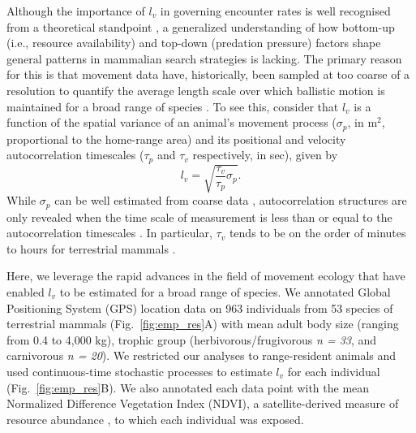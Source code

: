 \documentclass[12pt]{article}
\begin{document}
Although the importance of $l_v$ in governing encounter rates is well recognised from a theoretical standpoint \cite{Bartumeus:2002,Visser:2006,Bartumeus:2008,Tejedor:2012}, a generalized understanding of how bottom-up (i.e., resource availability) and top-down (predation pressure) factors shape general patterns in mammalian search strategies is lacking. The primary reason for this is that movement data have, historically, been sampled at too coarse of a resolution to quantify the average length scale over which ballistic motion is maintained for a broad range of species \cite{Kays:2015en}. To see this, consider that $l_v$ is a function of the spatial variance of an animal's movement process ($\sigma_p$, in m$^2$, proportional to the home-range area) and its positional and velocity autocorrelation timescales ($\tau_p$ and $\tau_v$ respectively, in sec), given by
\begin{equation}
l_v = \sqrt{\frac{\tau_v}{\tau_p}\sigma_p}.
\label{eq:lv}
\end{equation}
While $\sigma_p$ can be well estimated from coarse data \cite{AKDEvsKDE}, autocorrelation structures are only revealed when the time scale of measurement is less than or equal to the autocorrelation timescales \cite{Noonan:2019}. In particular, $\tau_v$ tends to be on the order of minutes to hours for terrestrial mammals \cite{Morato:2016ioa,Noonan:2019,Medici:2022}. %

Here, we leverage the rapid advances in the field of movement ecology \cite{Kays:2015en, Nathan:2022} that have enabled $l_v$ to be estimated for a broad range of species. We annotated Global Positioning System (GPS) location data on 963 individuals from 53 species of terrestrial mammals (Fig.~\ref{fig:emp_res}A) with mean adult body size (ranging from 0.4 to 4,000 kg), trophic group (herbivorous/frugivorous {\it n = 33}, and carnivorous {\it n = 20}). We restricted our analyses to range-resident animals and used continuous-time stochastic processes \cite{Calabrese:2016ey} to estimate $l_v$ for each individual (Fig.~\ref{fig:emp_res}B). We also annotated each data point with the mean Normalized Difference Vegetation Index (NDVI), a satellite-derived measure of resource abundance \cite{Pettorelli:2011}, to which each individual was exposed. %
\end{document}
